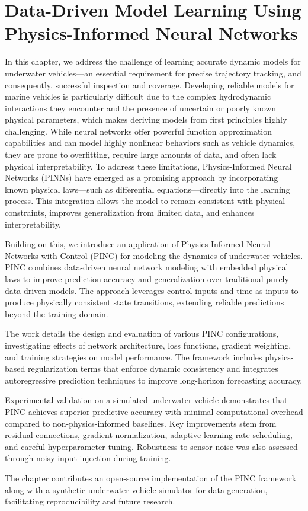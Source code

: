 \chapter{Data-Driven Model Learning Using Physics-Informed Neural Networks}


In this chapter, we address the challenge of learning accurate dynamic models for underwater vehicles—an essential requirement for precise trajectory tracking, and consequently, successful inspection and coverage. Developing reliable models for marine vehicles is particularly difficult due to the complex hydrodynamic interactions they encounter and the presence of uncertain or poorly known physical parameters, which makes deriving models from first principles highly challenging. While neural networks offer powerful function approximation capabilities and can model highly nonlinear behaviors such as vehicle dynamics, they are prone to overfitting, require large amounts of data, and often lack physical interpretability. To address these limitations, Physics-Informed Neural Networks (PINNs) have emerged as a promising approach by incorporating known physical laws—such as differential equations—directly into the learning process. This integration allows the model to remain consistent with physical constraints, improves generalization from limited data, and enhances interpretability.

Building on this, we introduce an application of Physics-Informed Neural Networks with Control (PINC) for modeling the dynamics of underwater vehicles. PINC combines data-driven neural network modeling with embedded physical laws to improve prediction accuracy and generalization over traditional purely data-driven models. The approach leverages control inputs and time as inputs to produce physically consistent state transitions, extending reliable predictions beyond the training domain.

The work details the design and evaluation of various PINC configurations, investigating effects of network architecture, loss functions, gradient weighting, and training strategies on model performance. The framework includes physics-based regularization terms that enforce dynamic consistency and integrates autoregressive prediction techniques to improve long-horizon forecasting accuracy.

Experimental validation on a simulated underwater vehicle demonstrates that PINC achieves superior predictive accuracy with minimal computational overhead compared to non-physics-informed baselines. Key improvements stem from residual connections, gradient normalization, adaptive learning rate scheduling, and careful hyperparameter tuning. Robustness to sensor noise was also assessed through noisy input injection during training.

The chapter contributes an open-source implementation of the PINC framework along with a synthetic underwater vehicle simulator for data generation, facilitating reproducibility and future research.

